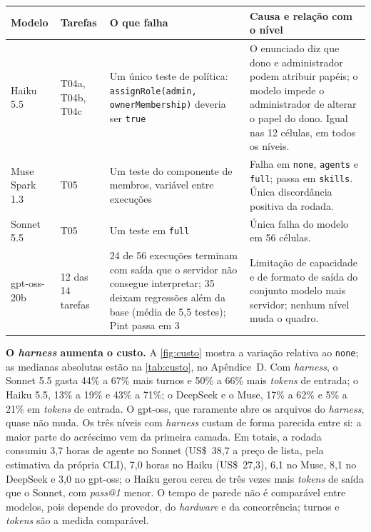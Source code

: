 \begin{quadro}[htb]
    \centering
    \ABNTEXfontereduzida
    \caption{\label{qdr:falhas}Falhas sistemáticas observadas na rodada reduzida}
    \begin{tabular}{|l|l|p{4.7cm}|p{4.7cm}|}
        \hline
        \textbf{Modelo} & \textbf{Tarefas} & \textbf{O que falha} & \textbf{Causa e relação com o nível} \\
        \hline
        Haiku 5.5 & T04a, T04b, T04c & Um único teste de política: \texttt{assignRole(admin, ownerMembership)} deveria ser \texttt{true} & O enunciado diz que dono e administrador podem atribuir papéis; o modelo impede o administrador de alterar o papel do dono. Igual nas 12 células, em todos os níveis. \\
        \hline
        Muse Spark 1.3 & T05 & Um teste do componente de membros, variável entre execuções & Falha em \texttt{none}, \texttt{agents} e \texttt{full}; passa em \texttt{skills}. Única discordância positiva da rodada. \\
        \hline
        Sonnet 5.5 & T05 & Um teste em \texttt{full} & Única falha do modelo em 56 células. \\
        \hline
        gpt-oss-20b & 12 das 14 tarefas & 24 de 56 execuções terminam com saída que o servidor não consegue interpretar; 35 deixam regressões além da base (média de 5,5 testes); Pint passa em 3 & Limitação de capacidade e de formato de saída do conjunto modelo mais servidor; nenhum nível muda o quadro. \\
        \hline
    \end{tabular}
    \fonteautor
\end{quadro}

\textbf{O \textit{harness} aumenta o custo.} A \autoref{fig:custo} mostra a variação
relativa ao \texttt{none}; as medianas absolutas estão na \autoref{tab:custo},
no Apêndice~D. Com \textit{harness}, o Sonnet 5.5 gasta 44\% a 67\% mais turnos
e 50\% a 66\% mais \textit{tokens} de entrada; o Haiku 5.5, 13\% a 19\% e 43\% a
71\%; o DeepSeek e o Muse, 17\% a 62\% e 5\% a 21\% em \textit{tokens} de
entrada. O gpt-oss, que raramente abre os arquivos do \textit{harness}, quase
não muda. Os três níveis com \textit{harness} custam de forma parecida entre
si: a maior parte do acréscimo vem da primeira camada. Em totais, a rodada
consumiu 3,7 horas de agente no Sonnet (US\$~38,7 a preço de lista, pela
estimativa da própria CLI), 7,0 horas no Haiku (US\$~27,3), 6,1 no Muse, 8,1 no
DeepSeek e 3,0 no gpt-oss; o Haiku gerou cerca de três vezes mais
\textit{tokens} de saída que o Sonnet, com \textit{pass@1} menor. O tempo de
parede não é comparável entre modelos, pois depende do provedor, do
\textit{hardware} e da concorrência; turnos e \textit{tokens} são a medida
comparável.

